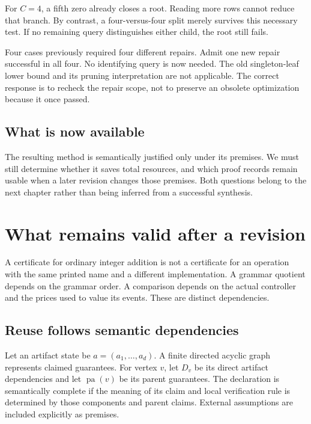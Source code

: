 For $C=4$, a fifth zero already closes a root. Reading more rows cannot reduce that branch. By contrast, a four-versus-four split merely survives this necessary test. If no remaining query distinguishes either child, the root still fails.

\begin{counterexample}\label{ce:universal}
Four cases previously required four different repairs. Admit one new repair successful in all four. No identifying query is now needed. The old singleton-leaf lower bound and its pruning interpretation are not applicable. The correct response is to recheck the repair scope, not to preserve an obsolete optimization because it once passed.
\end{counterexample}

\section*{What is now available}
The resulting method is semantically justified only under its premises. We must still determine whether it saves total resources, and which proof records remain usable when a later revision changes those premises. Both questions belong to the next chapter rather than being inferred from a successful synthesis.

\chapter{What remains valid after a revision}\label{ch:revision}
A certificate for ordinary integer addition is not a certificate for an operation with the same printed name and a different implementation. A grammar quotient depends on the grammar order. A comparison depends on the actual controller and the prices used to value its events. These are distinct dependencies.

\section{Reuse follows semantic dependencies}
Let an artifact state be $a=(a_1,\ldots,a_d)$. A finite directed acyclic graph represents claimed guarantees. For vertex $v$, let $D_v$ be its direct artifact dependencies and let $\operatorname{pa}(v)$ be its parent guarantees. The declaration is semantically complete if the meaning of its claim and local verification rule is determined by those components and parent claims. External assumptions are included explicitly as premises.


